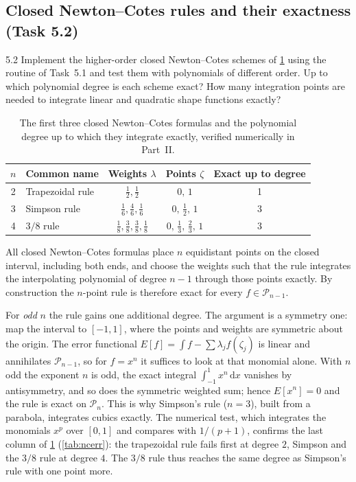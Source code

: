 \documentclass[11pt,a4paper]{article}
\numberwithin{equation}{section}
\theoremstyle{remark}
\begin{document}
\subsection{Closed Newton--Cotes rules and their exactness (Task 5.2)}\label{sec:exactness}

\begin{task}{5.2}
  Implement the higher-order closed Newton--Cotes schemes of \cref{tab:nc} using the
  routine of Task~5.1 and test them with polynomials of different order. Up to which
  polynomial degree is each scheme exact? How many integration points are needed to
  integrate linear and quadratic shape functions exactly?
\end{task}

\begin{table}[ht]
  \centering
  \caption{The first three closed Newton--Cotes formulas and the polynomial degree up to
    which they integrate exactly, verified numerically in Part~II.}
  \label{tab:nc}
  \begin{tabular}{clccc}
    \toprule
    $n$ & Common name & Weights $\lambda$ & Points $\zeta$ & Exact up to degree \\
    \midrule
    2 & Trapezoidal rule & $\tfrac12, \tfrac12$ & $0,\,1$ & 1 \\
    3 & Simpson rule     & $\tfrac16, \tfrac46, \tfrac16$ & $0,\,\tfrac12,\,1$ & 3 \\
    4 & $3/8$ rule       & $\tfrac18, \tfrac38, \tfrac38, \tfrac18$ & $0,\,\tfrac13,\,\tfrac23,\,1$ & 3 \\
    \bottomrule
  \end{tabular}
\end{table}

All closed Newton--Cotes formulas place $n$ equidistant points on the closed interval,
including both ends, and choose the weights such that the rule integrates the interpolating
polynomial of degree $n-1$ through those points exactly. By construction the $n$-point rule
is therefore exact for every $f \in \mathcal{P}_{n-1}$.

For \emph{odd} $n$ the rule gains one additional degree. The argument is a symmetry one:
map the interval to $[-1,1]$, where the points and weights are symmetric about the origin.
The error functional $E[f] = \int f - \sum\lambda_j f(\zeta_j)$ is linear and annihilates
$\mathcal{P}_{n-1}$, so for $f = x^{n}$ it suffices to look at that monomial alone. With
$n$ odd the exponent $n$ is odd, the exact integral $\int_{-1}^{1}x^{n}\,\mathrm{d}x$
vanishes by antisymmetry, and so does the symmetric weighted sum; hence $E[x^{n}] = 0$ and
the rule is exact on $\mathcal{P}_{n}$. This is why Simpson's rule ($n = 3$), built from a
parabola, integrates cubics exactly. The numerical test, which integrates the monomials $x^p$ over
$[0,1]$ and compares with $1/(p+1)$, confirms the last column of \cref{tab:nc}
(\cref{tab:ncerr}): the trapezoidal rule fails first at degree $2$, Simpson and the $3/8$ rule at
degree $4$. The $3/8$ rule thus reaches the same degree as Simpson's rule with one point more.
\end{document}
